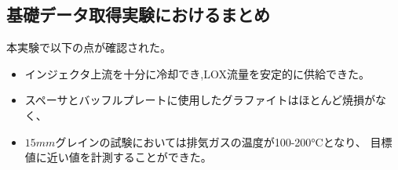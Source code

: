 \subsection{基礎データ取得実験におけるまとめ}
本実験で以下の点が確認された。
\begin{itemize}
\item インジェクタ上流を十分に冷却でき,LOX流量を安定的に供給できた。
\item スペーサとバッフルプレートに使用したグラファイトはほとんど焼損がなく、
\item $15mm$グレインの試験においては排気ガスの温度が100-200°Cとなり、
目標値に近い値を計測することができた。
\end{itemize}
